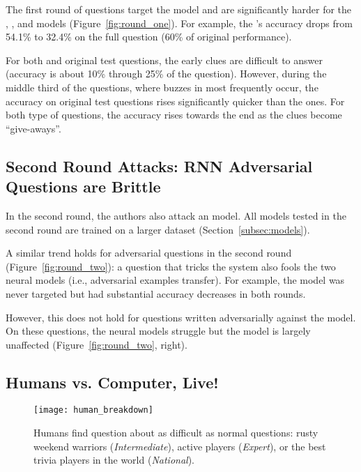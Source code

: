 The first round of \challenge{} questions target the  model
and are significantly harder for the ,
, and  models (Figure~\ref{fig:round_one}). For example,
the 's accuracy drops from 54.1\% to 32.4\% on the full question
 (60\% of original performance).

For both \challenge{} and original test questions, the early
clues are difficult to answer (accuracy is about
10\% through 25\% of the question). However, during the middle third 
of the questions, where buzzes in \qb{} most
frequently occur, the accuracy on original test questions rises
significantly quicker than the \challenge{} ones. For both type of questions,
the accuracy rises towards the end as the clues become
``give-aways''.

 \subsection{Second Round Attacks: RNN Adversarial Questions are Brittle}\label{subsec:two}

In the second round, the authors also attack an  model.
All models tested in the second round are trained on a larger dataset (Section~\ref{subsec:models}).

A similar trend holds for  adversarial questions
in the second round (Figure~\ref{fig:round_two}): a question that tricks the  system also fools
the two neural models (i.e., adversarial examples transfer). For example, the  model
was never targeted but had substantial
accuracy decreases in both rounds.

However, this does not hold for questions written adversarially
against the  model. On these questions, the neural models
struggle but the 
 model is largely
unaffected (Figure~\ref{fig:round_two}, right).

\subsection{Humans vs. Computer, Live!}
\label{subsec:live}

\begin{figure*}
\centering
\texttt{[image: human\_breakdown]}
\caption{Humans find \challenge{} question about as difficult as
  normal questions: rusty weekend
  warriors (\textit{Intermediate}), active players (\textit{Expert}), or
  the best trivia players in the world (\textit{National}).}
\label{fig:human_breakdown}
\end{figure*}

